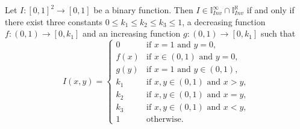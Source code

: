 \begin{proposition}\label{prop:InterStrictNilpot}
	Let $I:[0,1]^2 \to [0,1]$ be a binary function. Then $I \in  \mathbb{I}^{\infty}_{Inv} \cap \mathbb{I}^{\aleph}_{Inv}$ if and only if there exist three constants $0 \leq k_1 \leq k_2 \leq k_3 \leq 1$, a decreasing function $f:(0,1) \to [0,k_1]$ and an increasing function $g:(0,1) \to [0,k_1]$ such that
	\begin{equation*}
		I(x,y) =\left\{ \begin{array}{ll}
			0 & \text{if } x=1 \text{ and } y=0,\\
			f(x) &   \text{if }   x \in (0,1) \text{ and } y=0, \\
			g(y) &  \text{if }  x = 1 \text{ and } y\in (0,1), \\
			k_1 &  \text{if } x,y \in (0,1) \text{ and } x>y, \\
			k_2 &  \text{if } x,y \in (0,1) \text{ and } x=y, \\
			k_3 &  \text{if } x,y \in (0,1) \text{ and } x<y, \\
			1 & \text{otherwise.}
		\end{array}
		\right.
	\end{equation*}
\end{proposition}

